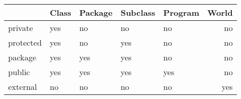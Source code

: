 \documentclass[11pt, a4paper]{report}
\begin{document}
    \begin{center}
        \begin{tabular}{lllllr}
            \hline
                    & Class & Package & Subclass & Program & World \\
            \hline
            private   & yes   & no      & no       & no      & no    \\
            protected & yes   & no      & yes      & no      & no    \\
            package   & yes   & yes     & yes      & no      & no    \\
            public    & yes   & yes     & yes      & yes     & no    \\
            external  & no    & no      & no       & no      & yes   \\
            \hline
        \end{tabular}\label{tab:table}
    \end{center}
\end{document}
